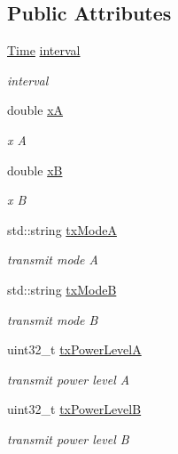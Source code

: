 \subsection*{Public Attributes}
\begin{DoxyCompactItemize}
\item 
\hyperlink{classns3_1_1Time}{Time} \hyperlink{structInterferenceExperiment_1_1Input_adecd5b2b5c7c4d2e30195d44487a8a45}{interval}
\begin{DoxyCompactList}\small\item\em interval \end{DoxyCompactList}\item 
double \hyperlink{structInterferenceExperiment_1_1Input_a6af2867adbbc4728d94b1a2591b8e12d}{xA}
\begin{DoxyCompactList}\small\item\em x A \end{DoxyCompactList}\item 
double \hyperlink{structInterferenceExperiment_1_1Input_a87cb6a23e8a0cd61578537cc093acba5}{xB}
\begin{DoxyCompactList}\small\item\em x B \end{DoxyCompactList}\item 
std\+::string \hyperlink{structInterferenceExperiment_1_1Input_a45a8de8e6656eb04108d500707f2827d}{tx\+ModeA}
\begin{DoxyCompactList}\small\item\em transmit mode A \end{DoxyCompactList}\item 
std\+::string \hyperlink{structInterferenceExperiment_1_1Input_a79f27f84600607d35444fb9840b5b3ef}{tx\+ModeB}
\begin{DoxyCompactList}\small\item\em transmit mode B \end{DoxyCompactList}\item 
uint32\+\_\+t \hyperlink{structInterferenceExperiment_1_1Input_a51a113cf642b065436543568a64d1c25}{tx\+Power\+LevelA}
\begin{DoxyCompactList}\small\item\em transmit power level A \end{DoxyCompactList}\item 
uint32\+\_\+t \hyperlink{structInterferenceExperiment_1_1Input_a4acd70506b27a4c59504e68639101fd1}{tx\+Power\+LevelB}
\begin{DoxyCompactList}\small\item\em transmit power level B \end{DoxyCompactList}\item 

\end{DoxyCompactItemize}
